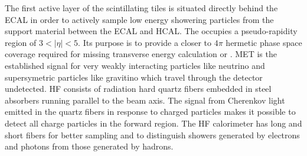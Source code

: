 The first active layer of the scintillating tiles is situated directly behind the ECAL in order to actively sample low energy showering particles from the support material between the ECAL and HCAL. 
\newline
The  occupies a pseudo-rapidity region of $3 < \vert \eta \vert < 5$.
Its purpose is to provide a closer to $4\pi$ hermetic phase space coverage required for missing transverse energy calculation or . MET is the established signal for very weakly interacting particles like neutrino and supersymetric particles like gravitino which travel through the detector undetected. %
HF consists of radiation hard quartz fibers embedded in steel absorbers running parallel to the beam axis. The signal from Cherenkov light emitted in the quartz fibers in response to charged particles makes it possible to detect all charge particles in the forward region. The HF calorimeter has long and short fibers for better sampling and to distinguish showers generated by electrons and photons from those generated by hadrons.
